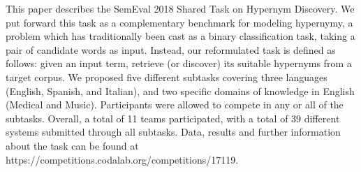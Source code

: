 This paper describes the SemEval 2018 Shared Task on Hypernym Discovery. We put forward this task as a complementary benchmark for modeling hypernymy, a problem which has traditionally been cast as a binary classification task, taking a pair of candidate words as input. Instead, our reformulated task is defined as follows: given an input term, retrieve (or discover) its suitable hypernyms from a target corpus. We proposed five different subtasks covering three languages (English, Spanish, and Italian), and two specific domains of knowledge in English (Medical and Music). Participants were allowed to compete in any or all of the subtasks. Overall, a total of 11 teams participated, with a total of 39 different systems submitted through all subtasks. Data, results and further information about the task can be found at https://competitions.codalab.org/competitions/17119.
